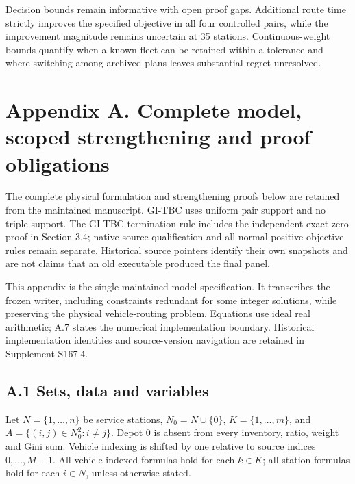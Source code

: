 \documentclass[
  american,
  11pt,
]{article}
\begin{document}
Decision bounds remain informative with open proof gaps. Additional
route time strictly improves the specified objective in all four
controlled pairs, while the improvement magnitude remains uncertain at
35 stations. Continuous-weight bounds quantify when a known fleet can be
retained within a tolerance and where switching among archived plans
leaves substantial regret unresolved.

\clearpage

\section{Appendix A. Complete model, scoped strengthening and proof
obligations}\label{appendix-a.-complete-model-scoped-strengthening-and-proof-obligations}

The complete physical formulation and strengthening proofs below are
retained from the maintained manuscript. GI-TBC uses uniform pair
support and no triple support. The GI-TBC termination rule includes the
independent exact-zero proof in Section 3.4; native-source qualification
and all normal positive-objective rules remain separate. Historical
source pointers identify their own snapshots and are not claims that an
old executable produced the final panel.

This appendix is the single maintained model specification. It
transcribes the frozen writer, including constraints redundant for some
integer solutions, while preserving the physical vehicle-routing
problem. Equations use ideal real arithmetic; A.7 states the numerical
implementation boundary. Historical implementation identities and
source-version navigation are retained in Supplement S167.4.

\subsection{A.1 Sets, data and
variables}\label{a.1-sets-data-and-variables}

Let \(N=\{1,\ldots,n\}\) be service stations, \(N_0=N\cup\{0\}\),
\(K=\{1,\ldots,m\}\), and \(A=\{(i,j)\in N_0^2:i\ne j\}\). Depot 0 is
absent from every inventory, ratio, weight and Gini sum. Vehicle
indexing is shifted by one relative to source indices \(0,\ldots,M-1\).
All vehicle-indexed formulas hold for each \(k\in K\); all station
formulas hold for each \(i\in N\), unless otherwise stated.
\end{document}
